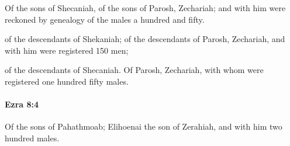 			\begin{versebox}
					\item[BHS] 
					\item[LXX] 
					\item[ASV] Of the sons of Shecaniah, of the sons of Parosh, Zechariah; and with him were reckoned by genealogy of the males a hundred and fifty.
					\item[NIV] of the descendants of Shekaniah; of the descendants of Parosh, Zechariah, and with him were registered 150 men;
					\item[NRSV] of the descendants of Shecaniah. Of Parosh, Zechariah, with whom were registered one hundred fifty males.
			\end{versebox}

		\paragraph{Ezra 8:4} %
			\label{EZRA-8-4}

			Of the sons of Pahathmoab; Elihoenai the son of Zerahiah, and with him two hundred males.

